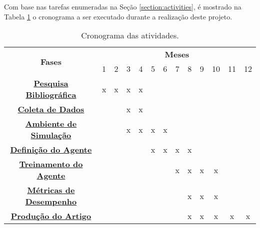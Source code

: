 
Com base nas tarefas enumeradas na Seção \ref{section:activities}, é mostrado na Tabela \ref{tab:chronogram} o cronograma a ser executado durante a realização deste projeto.

\begin{table}[ht]
\centering
\caption{Cronograma das atividades.}
\begin{tabular}{|c|c|c|c|c|c|c|c|c|c|c|c|c|}
\hline
\multirow{2}{*}{{\bf Fases}} & \multicolumn{12}{c|}{{\bf Meses}}
\\ \cline{2-13}
    & 1 & 2 & 3 & 4 & 5 & 6 & 7 & 8 & 9 & 10 & 11 & 12
\\ \hline
    {\bf \hyperref[item:bibliography_review]{Pesquisa Bibliográfica} } 
    & x & x & x & x & & & & & & & &
\\ \hline
    {\bf \hyperref[item:data]{Coleta de Dados}} 
    &  &  & x & x & & & & & & & &
\\ \hline
    {\bf \hyperref[item:environment]{Ambiente de Simulação}} 
    &  &  & x & x & x & x &  & & & & &
\\ \hline
    {\bf \hyperref[item:agent]{Definição do Agente}} 
    &  &  &  &  & x & x & x & x &  &  &  & 
\\ \hline
    {\bf \hyperref[item:training]{Treinamento do Agente}} 
    & & & & & & & x & x & x & x & & 
\\ \hline
    {\bf \hyperref[item:evaluation]{Métricas de Desempenho}} 
    &  &  &  &  &  &  &  & x & x & x & & 
\\ \hline
    {\bf \hyperref[item:publishing]{Produção do Artigo}} 
    & & & & & & & & x & x & x & x & x
\\ \hline
\end{tabular}
\label{tab:chronogram}
\end{table}
